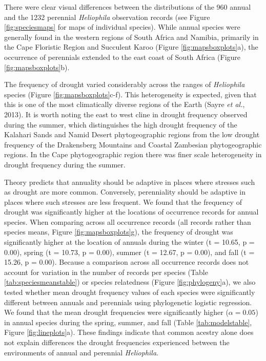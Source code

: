 \documentclass[man,floatsintext]{apa6}
\theoremstyle{definition}
\theoremstyle{definition}
\theoremstyle{definition}
\theoremstyle{remark}
\begin{document}
There were clear visual differences between the distributions of the 960
annual and the 1232 perennial \emph{Heliophila} observation records (see
Figure \ref{fig:speciesmaps} for maps of individual species). While
annual species were generally found in the western regions of South
Africa and Namibia, primarily in the Cape Floristic Region and Succulent
Karoo (Figure \ref{fig:mapsboxplots}a), the occurrence of perennials
extended to the east coast of South Africa (Figure
\ref{fig:mapsboxplots}b).

The frequency of drought varied considerably across the ranges of
\emph{Heliophila} species (Figure \ref{fig:mapsboxplots}c-f). This
heterogeneity is expected, given that this is one of the most
climatically diverse regions of the Earth (Sayre \emph{et al.}, 2013).
It is worth noting the east to west cline in drought frequency observed
during the summer, which distinguishes the high drought frequency of the
Kalahari Sands and Namid Desert phytogeographic regions from the low
drought frequency of the Drakensberg Mountains and Coastal Zambesian
phytogeographic regions. In the Cape phytogeographic region there was
finer scale heterogeneity in drought frequency during the summer.

Theory predicts that annuality should be adaptive in places where
stresses such as drought are more common. Conversely, perenniality
should be adaptive in places where such stresses are less frequent. We
found that the frequency of drought was significantly higher at the
locations of occurrence records for annual species. When comparing
across all occurrence records (all records rather than species means,
Figure \ref{fig:mapsboxplots}g), the frequency of drought was
significantly higher at the location of annuals during the winter (t =
10.65, p = 0.00), spring (t = 10.73, p = 0.00), summer (t = 12.67, p =
0.00), and fall (t = 15.26, p = 0.00). Because a comparison across all
occurrence records does not account for variation in the number of
records per species (Table \ref{tab:speciesmeanstable}) or species
relatedness (Figure \ref{fig:phylogeny}a), we also tested whether mean
drought frequency values of each species were significantly different
between annuals and perennials using phylogenetic logistic regression.
We found that the mean drought frequencies were significantly higher
(\(\alpha = 0.05\)) in annual species during the spring, summer, and
fall (Table \ref{tab:modelstable}, Figure \ref{fig:lineplots}a). These
findings indicate that common acestry alone does not explain differences
the drought frequencies experienced between the environments of annual
and perennial \emph{Heliophila}.
\end{document}

